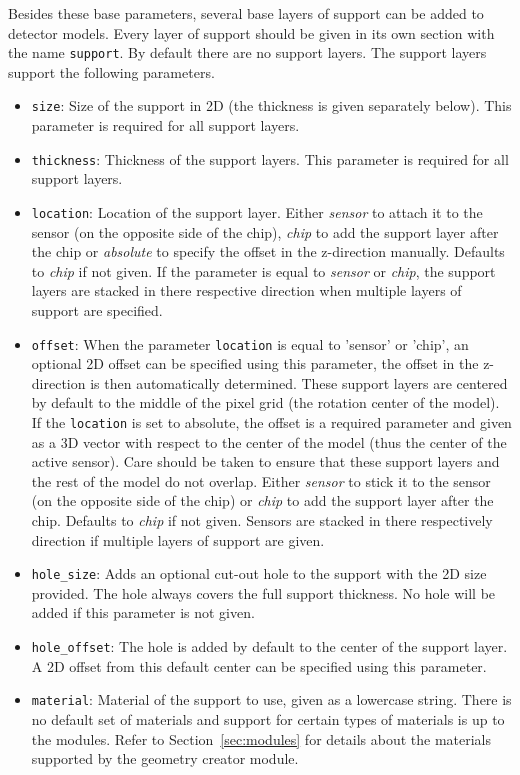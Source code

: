 Besides these base parameters, several base layers of support can be added to detector models.
Every layer of support should be given in its own section with the name \texttt{support}.
By default there are no support layers.
The support layers support the following parameters.
\begin{itemize}
\item \texttt{size}: Size of the support in 2D (the thickness is given separately below).
This parameter is required for all support layers.
\item \texttt{thickness}: Thickness of the support layers.
This parameter is required for all support layers.
\item \texttt{location}: Location of the support layer. 
Either \textit{sensor} to attach it to the sensor (on the opposite side of the chip), \textit{chip} to add the support layer after the chip or \textit{absolute} to specify the offset in the z-direction manually. 
Defaults to \textit{chip} if not given. If the parameter is equal to \textit{sensor} or \textit{chip}, the support layers are stacked in there respective direction when multiple layers of support are specified.
\item \texttt{offset}: When the parameter \texttt{location} is equal to 'sensor' or 'chip', an optional 2D offset can be specified using this parameter, the offset in the z-direction is then automatically determined. 
These support layers are centered by default to the middle of the pixel grid (the rotation center of the model). 
If the \texttt{location} is set to absolute, the offset is a required parameter and given as a 3D vector with respect to the center of the model (thus the center of the active sensor). 
Care should be taken to ensure that these support layers and the rest of the model do not overlap.
Either \textit{sensor} to stick it to the sensor (on the opposite side of the chip) or \textit{chip} to add the support layer after the chip.
Defaults to \textit{chip} if not given.
Sensors are stacked in there respectively direction if multiple layers of support are given.
\item \texttt{hole\_size}: Adds an optional cut-out hole to the support with the 2D size provided.
The hole always covers the full support thickness.
No hole will be added if this parameter is not given.
\item \texttt{hole\_offset}: The hole is added by default to the center of the support layer.
A 2D offset from this default center can be specified using this parameter.
\item \texttt{material}: Material of the support to use, given as a lowercase string.
There is no default set of materials and support for certain types of materials is up to the modules.
Refer to Section~\ref{sec:modules} for details about the materials supported by the geometry creator module.
\end{itemize}

